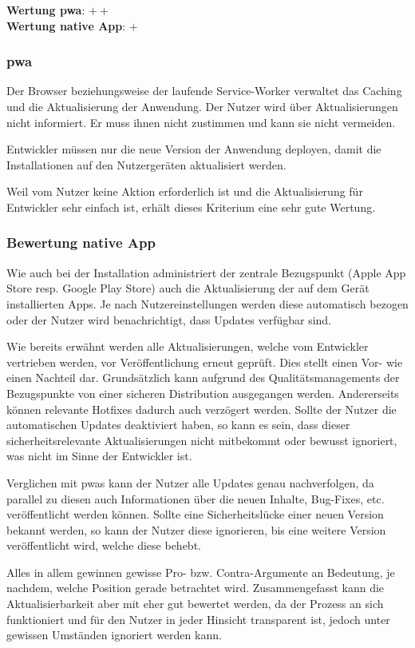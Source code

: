 \textbf{Wertung \ac{pwa}}: $++$ \\
\textbf{Wertung native App}: $+$ \\

\subsubsection{\ac{pwa}}
Der Browser beziehungsweise der laufende Service-Worker verwaltet das Caching und die Aktualisierung der Anwendung. Der Nutzer wird über Aktualisierungen nicht informiert. Er muss ihnen nicht zustimmen und kann sie nicht vermeiden. 

Entwickler müssen nur die neue Version der Anwendung deployen, damit die Installationen auf den Nutzergeräten aktualisiert werden.

Weil vom Nutzer keine Aktion erforderlich ist und die Aktualisierung für Entwickler sehr einfach ist, erhält dieses Kriterium eine sehr gute Wertung.

\subsubsection{Bewertung native App}
Wie auch bei der Installation administriert der zentrale Bezugspunkt (Apple App Store resp. Google Play Store) auch die Aktualisierung der auf dem Gerät installierten Apps. Je nach Nutzereinstellungen werden diese automatisch bezogen oder der Nutzer wird benachrichtigt, dass Updates verfügbar sind.

Wie bereits erwähnt werden alle Aktualisierungen, welche vom Entwickler vertrieben werden, vor Veröffentlichung erneut geprüft. Dies stellt einen Vor- wie einen Nachteil dar. Grundsätzlich kann aufgrund des Qualitätsmanagements der Bezugspunkte von einer sicheren Distribution ausgegangen werden. Andererseits können relevante Hotfixes dadurch auch verzögert werden. Sollte der Nutzer die automatischen Updates deaktiviert haben, so kann es sein, dass dieser sicherheitsrelevante Aktualisierungen nicht mitbekommt oder bewusst ignoriert, was nicht im Sinne der Entwickler ist.

Verglichen mit \acp{pwa} kann der Nutzer alle Updates genau nachverfolgen, da parallel zu diesen auch Informationen über die neuen Inhalte, Bug-Fixes, etc. veröffentlicht werden können. Sollte eine Sicherheitslücke einer neuen Version bekannt werden, so kann der Nutzer diese ignorieren, bis eine weitere Version veröffentlicht wird, welche diese behebt.

Alles in allem gewinnen gewisse Pro- bzw. Contra-Argumente an Bedeutung, je nachdem, welche Position gerade betrachtet wird. Zusammengefasst kann die Aktualisierbarkeit aber mit eher gut bewertet werden, da der Prozess an sich funktioniert und für den Nutzer in jeder Hinsicht transparent ist, jedoch unter gewissen Umständen ignoriert werden kann.